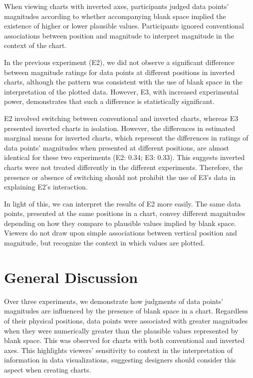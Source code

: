 \documentclass[journal]{vgtc}                %
\begin{document}
When viewing charts with inverted axes, participants judged data points'
magnitudes according to whether accompanying blank space implied the
existence of higher or lower plausible values. Participants ignored
conventional associations between position and magnitude to interpret
magnitude in the context of the chart.

In the previous experiment (E2), we did not observe a significant
difference between magnitude ratings for data points at different
positions in inverted charts, although the pattern was consistent with
the use of blank space in the interpretation of the plotted data.
However, E3, with increased experimental power, demonstrates that such a
difference is statistically significant.

E2 involved switching between conventional and inverted charts, whereas
E3 presented inverted charts in isolation. However, the differences in
estimated marginal means for inverted charts, which represent the
differences in ratings of data points' magnitudes when presented at
different positions, are almost identical for these two experiments (E2:
0.34; E3:
0.33). This suggests inverted charts
were not treated differently in the different experiments. Therefore,
the presence or absence of switching should not prohibit the use of E3's
data in explaining E2's interaction.

In light of this, we can interpret the results of E2 more easily. The
same data points, presented at the same positions in a chart, convey
different magnitudes depending on how they compare to plausible values
implied by blank space. Viewers do not draw upon simple associations
between vertical position and magnitude, but recognize the context in
which values are plotted.

\hypertarget{general-discussion}{%
\section{General Discussion}\label{general-discussion}}

Over three experiments, we demonstrate how judgments of data points'
magnitudes are influenced by the presence of blank space in a chart.
Regardless of their physical positions, data points were associated with
greater magnitudes when they were numerically greater than the plausible
values represented by blank space. This was observed for charts with
both conventional and inverted axes. This highlights viewers'
sensitivity to context in the interpretation of information in data
visualizations, suggesting designers should consider this aspect when
creating charts.
\end{document}
